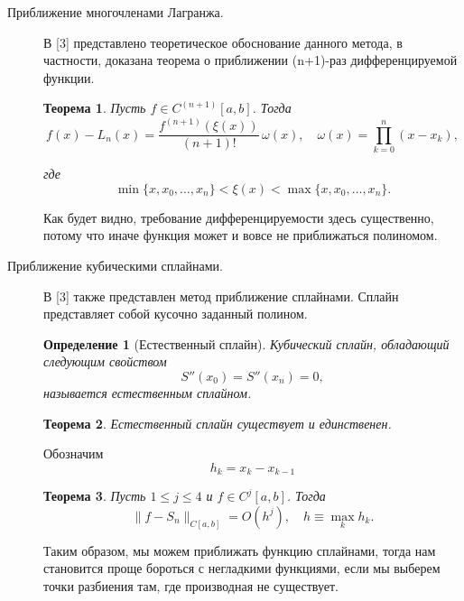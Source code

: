 \documentclass{article}
\newtheorem{theorem}{Теорема}
\newtheorem{definition}{Определение}[section]
\begin{document}
\begin{description}
    \item[Приближение многочленами Лагранжа.]

    В [3] представлено теоретическое обоснование данного метода, в частности, доказана теорема о приближении (n+1)-раз дифференцируемой функции.

    \begin{theorem}
        Пусть \(f \in C^{(n+1)}[a,b]\). Тогда
        \begin{equation}
            f(x) - L_n(x) = \frac{f^{(n+1)}(\xi(x))}{(n+1)!} \, \omega(x), \quad \omega(x) = \prod_{k=0}^{n} (x - x_k),
            \label{eq:lagrange_error}
        \end{equation}

        где
        \begin{equation}
            \min\{x, x_0, \ldots, x_n\} < \xi(x) < \max\{x, x_0, \ldots, x_n\}.
            \label{eq:placeholder}
        \end{equation}
    \end{theorem}

    Как будет видно, требование дифференцируемости здесь существенно, потому что иначе функция может и вовсе не приближаться полиномом.

    \item[Приближение кубическими сплайнами.]

    В [3] также представлен метод приближение сплайнами. Сплайн представляет собой кусочно заданный полином.
    \begin{definition}[Естественный сплайн]
        Кубический сплайн, обладающий следующим свойством
        \begin{equation}
            S''(x_0) = S''(x_n) = 0,
            \label{eq:placeholder_label}
        \end{equation}
        называется естественным сплайном.
    \end{definition}    

    \begin{theorem}
        Естественный сплайн существует и единственен.
    \end{theorem}

    Обозначим
    \begin{equation}
        h_k = x_k - x_{k-1}
    \end{equation}

    \begin{theorem}
        Пусть \(1 \leq j \leq 4\) и \(f \in C^j[a, b]\). Тогда
        \begin{equation}
            \|f - S_n\|_{C[a, b]} = O(h^j), \quad h \equiv \max_k h_k.
            \label{eq:example}
        \end{equation}
    \end{theorem}

    Таким образом, мы можем приближать функцию сплайнами, тогда нам становится проще бороться с негладкими функциями, если мы выберем точки разбиения там, где производная не существует.
\end{description}
\end{document}
